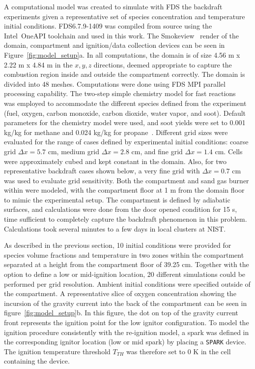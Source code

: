 \documentclass[12pt,letterpaper]{article}
\begin{document}
\begin{flushleft}
A computational model was created to simulate with FDS the backdraft experiments given a representative set of species concentration and temperature initial conditions. FDS6.7.9-1409 was compiled from source using the Intel\textregistered~OneAPI toolchain and used in this work. The Smokeview~\cite{Smokeview_Users_Guide} render of the domain, compartment and ignition/data collection devices can be seen in Figure~\ref{fig:model_setup}a. In all computations, the domain is of size 4.56 m x 2.22 m x 4.84 m in the $x,y,z$ directions, deemed appropriate to capture the combustion region inside and outside the compartment correctly. The domain is divided into 48 meshes. Computations were done using FDS MPI parallel processing capability. The two-step simple chemistry model for fast reactions~\cite{FDS_Users_Guide} was employed to accommodate the different species defined from the experiment (fuel, oxygen, carbon monoxide, carbon dioxide, water vapor, and soot). Default parameters for the chemistry model were used, and soot yields were set to 0.001 kg/kg for methane and 0.024 kg/kg for propane~\cite{SFPE:Tewarson}.
Different grid sizes were evaluated for the range of cases defined by experimental initial conditions: coarse grid $\Delta x=5.7$ cm, medium grid $\Delta x=2.8$ cm, and fine grid $\Delta x=1.4$ cm. Cells were approximately cubed and kept constant in the domain. Also, for two representative backdraft cases shown below, a very fine grid with $\Delta x=0.7$ cm was used to evaluate grid sensitivity. Both the compartment and sand gas burner within were modeled, with the compartment floor at 1 m from the domain floor to mimic the experimental setup. The compartment is defined by adiabatic surfaces, and calculations were done from the door opened condition for 15 s, time sufficient to completely capture the backdraft phenomenon in this problem. Calculations took several minutes to a few days in local clusters at NIST.

As described in the previous section, 10 initial conditions were provided for species volume fractions and temperature in two zones within the compartment separated at a height from the compartment floor of 39.25 cm. Together with the option to define a low or mid-ignition location, 20 different simulations could be performed per grid resolution. Ambient initial conditions were specified outside of the compartment. 
A representative slice of oxygen concentration showing the incursion of the gravity current into the back of the compartment can be seen in figure~\ref{fig:model_setup}b. In this figure, the dot on top of the gravity current front represents the ignition point for the low ignitor configuration. To model the ignition procedure consistently with the re-ignition model, a spark was defined in the corresponding ignitor location (low or mid spark) by placing a \texttt{SPARK} device. The ignition temperature threshold $T_{TH}$ was therefore set to 0 K in the cell containing the device. 


\end{flushleft}
\end{document}

